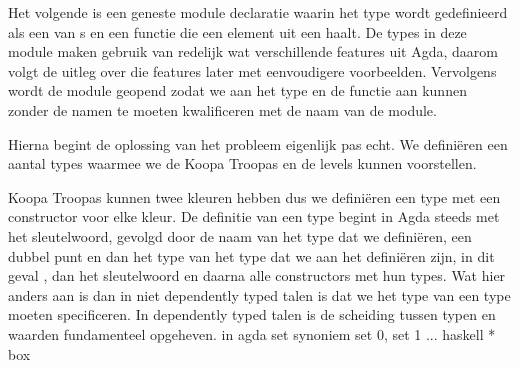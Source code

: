 Het volgende is een geneste module declaratie waarin het type 
wordt gedefinieerd als een  van s en een functie die een
element uit een  haalt. De types in deze module maken gebruik van
redelijk wat verschillende features uit Agda, daarom volgt de uitleg over die
features later met eenvoudigere voorbeelden. Vervolgens wordt de module geopend
zodat we aan het type en de functie aan kunnen zonder de namen te moeten
kwalificeren met de naam van de module.


Hierna begint de oplossing van het probleem eigenlijk pas echt. We definiëren
een aantal types waarmee we de Koopa Troopas en de levels kunnen voorstellen.


Koopa Troopas kunnen twee kleuren hebben dus we definiëren een type
 met een constructor voor elke kleur. De definitie van een type
begint in Agda steeds met het  sleutelwoord, gevolgd door de naam
van het type dat we definiëren, een dubbel punt en dan het type van het type dat
we aan het definiëren zijn, in dit geval , dan het sleutelwoord
 en daarna alle constructors met hun types. Wat hier anders aan is
dan in niet dependently typed talen is dat we het type van een type moeten
specificeren. In dependently typed talen is de scheiding tussen typen en
waarden fundamenteel opgeheven. in agda set synoniem set 0, set 1 ... haskell *
box
